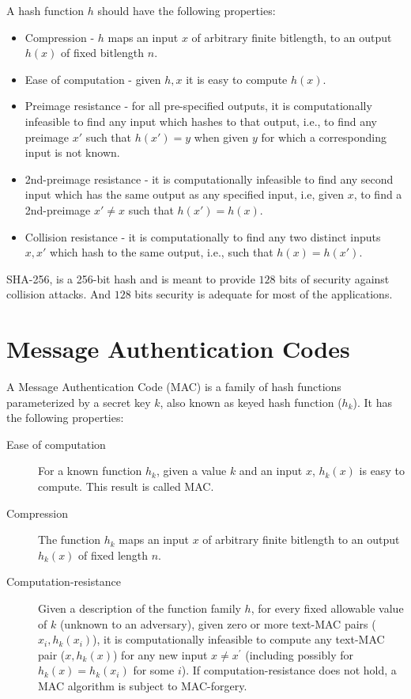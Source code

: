 	A hash function $h$ should have the following properties:
	\begin{itemize}
		\item Compression - $h$ maps an input $x$ of arbitrary finite bitlength, to an output $h(x)$ of fixed bitlength $n$.
		\item Ease of computation - given $h,x$ it is easy to compute $h(x)$.
		\item Preimage resistance - for all pre-specified outputs, it is computationally infeasible to find any input which hashes to that output, i.e., to find any preimage $x'$ such that $h(x') = y$ when given $y$ for which a corresponding input is not known.
		\item 2nd-preimage resistance - it is computationally infeasible to find any second input which has the same output as any specified input, i.e, given $x$, to find a 2nd-preimage $x' \neq x$ such that $h(x') = h(x)$.
		\item Collision resistance - it is computationally to find any two distinct inputs $x,x'$ which hash to the same output, i.e., such that $h(x) = h(x')$.
	\end{itemize} 

	SHA-256, is a 256-bit hash and is meant to provide $128$ bits of security against collision attacks\cite{SHA256}.
	And $128$ bits security is adequate for most of the applications.

\section{Message Authentication Codes}
A Message Authentication Code (MAC) is a family of hash functions parameterized by a secret key $k$, also known as keyed hash function ($h_{k}$).
It has the following properties:
\begin{description}
	\item [Ease of computation] For a known function $h_{k}$, given a value $k$
	and an input $x$, $h_{k}(x)$ is easy to compute.
	This result is called MAC.
	\item [Compression] The function $h_{k}$ maps an input $x$ of arbitrary finite bitlength to an output $h_{k}(x)$ of fixed length $n$.  
	\item [Computation-resistance] Given a description of the function family $h$, for every fixed allowable value of $k$ (unknown to an adversary), given zero or more text-MAC pairs ($x_{i}, h_{k}(x_{i})$), it is computationally infeasible to compute any text-MAC pair ($x,h_{k}(x)$) for any new input $x \neq x^{'}$ (including possibly for $h_{k}(x) = h_{k}(x_{i})$ for some $i$). 
If computation-resistance does not hold, a MAC algorithm is subject to MAC-forgery.
\end{description}
